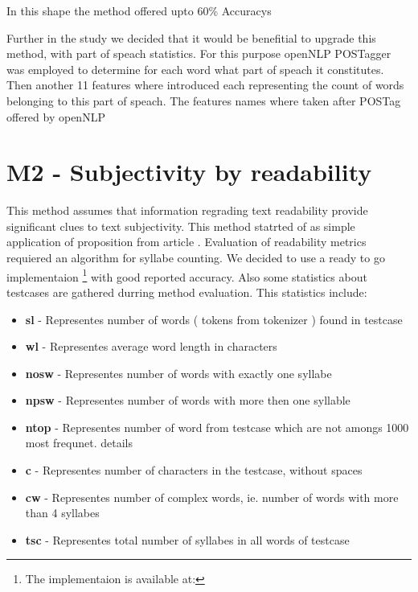 In this shape the method offered upto 60\% Accuracys


Further in the study we decided that it would be benefitial to upgrade this method, with part of speach statistics. 
For this purpose openNLP POSTagger was employed to determine for each word what part of speach it constitutes. Then another 11 features where introduced each representing the count of words belonging
to this part of speach. The features names where taken after POSTag offered by openNLP


\section{M2 - Subjectivity by readability}


This method assumes that information regrading text readability provide significant clues to text subjectivity. 
This method statrted of as simple application of proposition from article \cite{remus2011}.  Evaluation of readability metrics requiered an algorithm for syllabe counting. 
We decided to use a ready to go implementaion \footnote{ The implementaion is available at: 
 } 
with good reported accuracy. Also some statistics about testcases are gathered durring method evaluation. This statistics include:
\begin{itemize}
\item \textbf{sl} - Representes number of words ( tokens from tokenizer ) found in testcase
\item \textbf{wl} - Representes average word length in characters 
\item \textbf{nosw} - Representes number of words with exactly one syllabe
\item \textbf{npsw} - Representes number of words with more then one syllable
\item \textbf{ntop} - Representes number of word from testcase which are not amongs 1000 most frequnet. details \cite{remus2011}
\item \textbf{c} - Representes number of characters in the testcase, without spaces
\item \textbf{cw} - Representes number of complex words, ie. number of words with more than 4 syllabes
\item \textbf{tsc} - Representes total number of syllabes in all words of testcase
\end{itemize}

